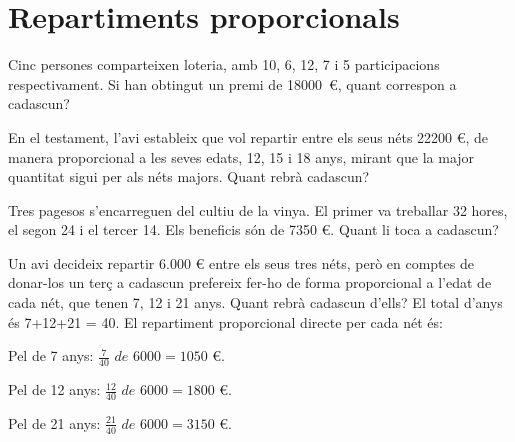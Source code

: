 \section{Repartiments proporcionals}

\begin{mylist}
	\exer
	Cinc persones comparteixen loteria, amb 10, 6, 12, 7 i 5
	participacions respectivament. Si han obtingut un premi de
	18000~\euro{}, quant correspon a cadascun?
	
	
	\exer
	En el testament, l'avi estableix que vol repartir entre els seus néts
	22200 \euro{}, de manera proporcional a les seves edats, 12, 15 i 18
	anys, mirant que la major quantitat sigui per als néts majors. Quant
	rebrà cadascun?
	
	
	\exer
	Tres pagesos s'encarreguen del cultiu de la vinya. El primer va treballar 32 hores, el segon 24 i el tercer 14. Els beneficis són de 7350 \euro{}. Quant li toca a cadascun?
	
\end{mylist}

\pagebreak

\begin{resolt}{
Un avi decideix repartir 6.000 € entre els seus tres néts, però en comptes de donar-los un terç a cadascun prefereix fer-ho de forma proporcional a l'edat de cada nét, que tenen 7, 12 i 21 anys. Quant rebrà cadascun d'ells?
	}
	El total d'anys és 7+12+21 = 40. El repartiment proporcional directe per cada nét és:
	
	Pel de 7 anys: $\frac{7}{40} \,\, de\,\,  6000 =1050$ \euro. 
	
	Pel de 12 anys: $\frac{12}{40} \,\, de \,\, 6000 =1800$ \euro. 
	
	Pel de 21 anys: $\frac{21}{40} \,\, de\,\,  6000 =3150$ \euro. 
\end{resolt}

